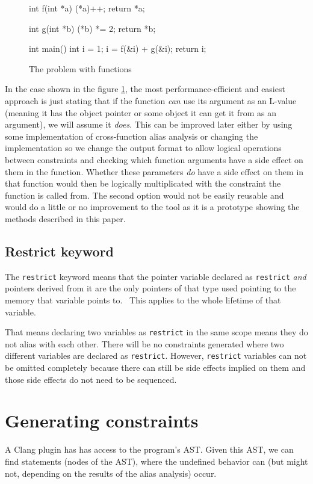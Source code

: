 \begin{figure}
\caption{The problem with functions}
\label{functions-source}
\begin{code}
int f(int *a){
    (*a)++;
    return *a;
}

int g(int *b){
    (*b) *= 2;
    return *b;
}

int main(){
    int i = 1;
    i = f(&i) + g(&i);
    return i;
}
\end{code}
\end{figure}

In the case shown in the figure \ref{functions-source}, the most performance-efficient and easiest approach is just stating that if the function \emph{can} use its argument as an L-value (meaning it has the object pointer or some object it can get it from as an argument), we will assume it \emph{does}. This can be improved later either by using some implementation of cross-function alias analysis or changing the implementation so we change the output format to allow logical operations between constraints and checking which function arguments have a side effect on them in the function. Whether these parameters \emph{do} have a side effect on them in that function would then be logically multiplicated with the constraint the function is called from. The second option would not be easily reusable and would do a little or no improvement to the tool as it is a prototype showing the methods described in this paper.

\subsection{Restrict keyword}
The \verb|restrict| keyword means that the pointer variable declared as \verb|restrict| \emph{and} pointers derived from it are the only pointers of that type used pointing to the memory that variable points to.~\cite{WG14N1570} This applies to the whole lifetime of that variable.

That means declaring two variables as \verb|restrict| in the same scope means they do not alias with each other.
There will be no constraints generated where two different variables are declared as \verb|restrict|.
However, \verb|restrict| variables can not be omitted completely because there can still be side effects
implied on them and those side effects do not need to be sequenced.

\section{Generating constraints}
A Clang plugin has has access to the program's AST. Given this AST, we can find statements (nodes of the AST), where the undefined behavior can (but might not, depending on the results of the alias analysis) occur.
